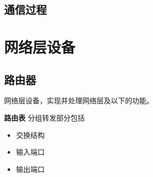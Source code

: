 \subsection{通信过程}


\section{网络层设备}

\subsection{路由器}
网络层设备，实现并处理网络层及以下的功能。

\textbf{路由表}
分组转发部分包括\begin{itemize}
    \item 交换结构
    \item 输入端口
    \item 输出端口
\end{itemize}

